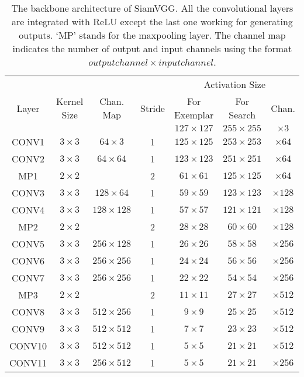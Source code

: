 \documentclass[runningheads]{llncs}
\begin{document}
\begin{table}[t]
\begin{center}
\caption{The backbone architecture of SiamVGG. All the convolutional layers are integrated with ReLU except the last one working for generating outputs. `MP' stands for the maxpooling layer. The channel map indicates the number of output and input channels using the format $output channel \times input channel$.}
\label{table:siamvgg}
  \begin{tabular}{ccccccc}
    \toprule
    
       \quad& \quad & \quad
      & \quad &
      \multicolumn{3}{c}{Activation Size} \\
     Layer & Kernel Size & Chan. Map & Stride & For Exemplar & For Search & Chan. \\
      \midrule
    \quad  & \quad        & \quad            & \quad & $127 \times 127$ & $255 \times 255$ & $\times 3  $ \\
    CONV1  & $3 \times 3$ & $64 \times 3$    & 1     & $125 \times 125$ & $253 \times 253$ & $\times 64 $ \\
    CONV2  & $3 \times 3$ & $64 \times 64$   & 1     & $123 \times 123$ & $251 \times 251$ & $\times 64 $ \\
    MP1    & $2 \times 2$ & \quad            & 2     & $61  \times 61 $ & $125 \times 125$ & $\times 64 $ \\
    CONV3  & $3 \times 3$ & $128 \times 64$  & 1     & $59  \times 59 $ & $123 \times 123$ & $\times 128$ \\
    CONV4  & $3 \times 3$ & $128 \times 128$ & 1     & $57  \times 57 $ & $121 \times 121$ & $\times 128$ \\
    MP2    & $2 \times 2$ & \quad            & 2     & $28  \times 28 $ & $60  \times  60$ & $\times 128$ \\
    CONV5  & $3 \times 3$ & $256 \times 128$ & 1     & $26  \times 26 $ & $58  \times  58$ & $\times 256$ \\
    CONV6  & $3 \times 3$ & $256 \times 256$ & 1     & $24  \times 24 $ & $56  \times  56$ & $\times 256$ \\
    CONV7  & $3 \times 3$ & $256 \times 256$ & 1     & $22  \times 22 $ & $54  \times  54$ & $\times 256$ \\
    MP3    & $2 \times 2$ & \quad            & 2     & $11  \times 11 $ & $27  \times  27$ & $\times 512$ \\
    CONV8  & $3 \times 3$ & $512 \times 256$ & 1     & $9   \times 9  $ & $25  \times  25$ & $\times 512$ \\
    CONV9  & $3 \times 3$ & $512 \times 512$ & 1     & $7   \times 7  $ & $23  \times  23$ & $\times 512$ \\
    CONV10 & $3 \times 3$ & $512 \times 512$ & 1     & $5   \times 5  $ & $21  \times  21$ & $\times 512$ \\
    CONV11 & $3 \times 3$ & $256 \times 512$ & 1     & $5   \times 5  $ & $21  \times  21$ & $\times 256$ \\
    \bottomrule
  \end{tabular}
\end{center}
\end{table}
\setlength{\tabcolsep}{1.4pt}
\end{document}
